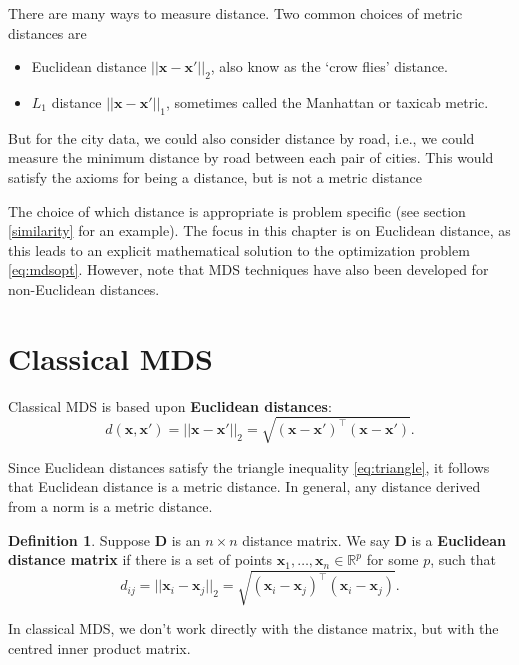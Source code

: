 \documentclass[
]{book}
\providecommand{\tightlist}{%
  \setlength{\itemsep}{0pt}\setlength{\parskip}{0pt}}
\theoremstyle{definition}
\newtheorem{definition}{Definition}[chapter]
\theoremstyle{definition}
\theoremstyle{definition}
\theoremstyle{definition}
\theoremstyle{remark}
\begin{document}
There are many ways to measure distance. Two common choices of metric distances are

\begin{itemize}
\tightlist
\item
  Euclidean distance \(||\mathbf x-\mathbf x'||_2\), also know as the `crow flies' distance.
\item
  \(L_1\) distance \(||\mathbf x-\mathbf x'||_1\), sometimes called the Manhattan or taxicab metric.
\end{itemize}

But for the city data, we could also consider distance by road, i.e., we could measure the minimum distance by road between each pair of cities. This would satisfy the axioms for being a distance, but is not a metric distance

The choice of which distance is appropriate is problem specific (see section \ref{similarity} for an example). The focus in this chapter is on Euclidean distance, as this leads to an explicit mathematical solution to the optimization problem \eqref{eq:mdsopt}. However, note that MDS techniques have also been developed for non-Euclidean distances.

\hypertarget{classical-mds}{%
\section{Classical MDS}\label{classical-mds}}

Classical MDS is based upon \textbf{Euclidean distances}:
\[d(\mathbf x, \mathbf x') = ||\mathbf x-\mathbf x'||_2 = \sqrt{(\mathbf x-\mathbf x')^\top (\mathbf x-\mathbf x')}.\]

Since Euclidean distances satisfy the triangle
inequality \eqref{eq:triangle}, it follows that Euclidean distance is a metric distance. In general, any distance derived from a norm is a metric distance.

\begin{definition}
\protect\hypertarget{def:euclideanD}{}\label{def:euclideanD}Suppose \(\mathbf D\) is an \(n\times n\) distance matrix. We say \(\mathbf D\) is a \textbf{Euclidean distance matrix}
if there is a set of points \(\mathbf x_1,\ldots , \mathbf x_n \in \mathbb{R}^p\) for some \(p\), such that
\[
d_{ij}=\vert \vert \mathbf x_i -\mathbf x_j \vert \vert_2 =\sqrt{(\mathbf x_i-\mathbf x_j)^\top (\mathbf x_i-\mathbf x_j)}.
\]
\end{definition}

In classical MDS, we don't work directly with the distance matrix, but with the centred inner product matrix.
\end{document}
